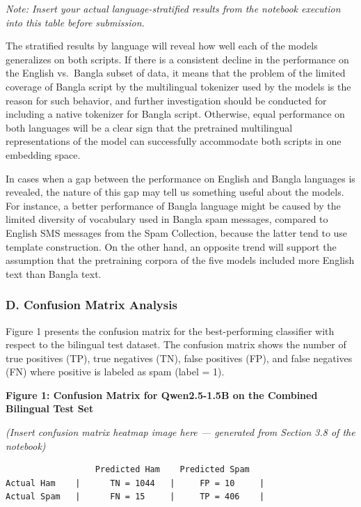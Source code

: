 \emph{Note: Insert your actual language-stratified results from the
notebook execution into this table before submission.}

The stratified results by language will reveal how well each of the
models generalizes on both scripts. If there is a consistent decline in
the performance on the English vs.~Bangla subset of data, it means that
the problem of the limited coverage of Bangla script by the multilingual
tokenizer used by the models is the reason for such behavior, and
further investigation should be conducted for including a native
tokenizer for Bangla script. Otherwise, equal performance on both
languages will be a clear sign that the pretrained multilingual
representations of the model can successfully accommodate both scripts
in one embedding space.

In cases when a gap between the performance on English and Bangla
languages is revealed, the nature of this gap may tell us something
useful about the models. For instance, a better performance of Bangla
language might be caused by the limited diversity of vocabulary used in
Bangla spam messages, compared to English SMS messages from the Spam
Collection, because the latter tend to use template construction. On the
other hand, an opposite trend will support the assumption that the
pretraining corpora of the five models included more English text than
Bangla text.

\subsubsection{D. Confusion Matrix
Analysis}\label{d.-confusion-matrix-analysis}

Figure 1 presents the confusion matrix for the best-performing
classifier with respect to the bilingual test dataset. The confusion
matrix shows the number of true positives (TP), true negatives (TN),
false positives (FP), and false negatives (FN) where positive is labeled
as spam (label = 1).

\textbf{Figure 1: Confusion Matrix for Qwen2.5-1.5B on the Combined
Bilingual Test Set}

\emph{(Insert confusion matrix heatmap image here --- generated from
Section 3.8 of the notebook)}

\begin{verbatim}
                  Predicted Ham    Predicted Spam
Actual Ham    |      TN = 1044   |     FP = 10     |
Actual Spam   |      FN = 15     |     TP = 406    |
\end{verbatim}

